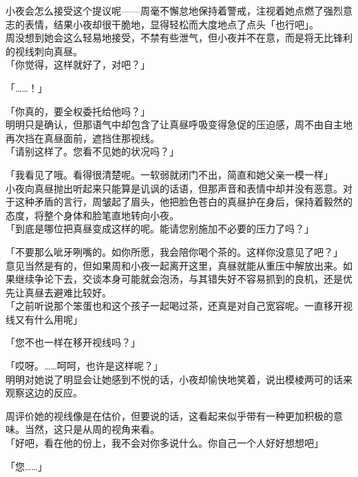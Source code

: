 小夜会怎么接受这个提议呢——周毫不懈怠地保持着警戒，注视着她点燃了强烈意志的表情，结果小夜却很干脆地，显得轻松而大度地点了点头「也行吧」。\\

周没想到她会这么轻易地接受，不禁有些泄气，但小夜并不在意，而是将无比锋利的视线刺向真昼。\\

「你觉得，这样就好了，对吧？」

「……！」

「你真的，要全权委托给他吗？」\\

明明只是确认，但那语气中却包含了让真昼呼吸变得急促的压迫感，周不由自主地再次挡在真昼面前，遮挡住那视线。\\

「请别这样了。您看不见她的状况吗？」

「我看见了哦。看得很清楚呢。一软弱就闭门不出，简直和她父亲一模一样」\\

小夜向真昼抛出听起来只能算是讥讽的话语，但那声音和表情中却并没有恶意。对于这种矛盾的言行，周皱起了眉头，他把脸色苍白的真昼护在身后，保持着毅然的态度，将整个身体和脸笔直地转向小夜。\\

「到底是哪位把真昼变成这样的呢。能请您别施加不必要的压力了吗？」

「不要那么呲牙咧嘴的。如你所愿，我会陪你喝个茶的。这样你没意见了吧？」\\

意见当然是有的，但如果周和小夜一起离开这里，真昼就能从重压中解放出来。如果继续争论下去，交谈本身可能就会泡汤，与其错失好不容易抓到的良机，还是优先让真昼去避难比较好。\\

「之前听说那个笨蛋也和这个孩子一起喝过茶，还真是对自己宽容呢。一直移开视线又有什么用呢」

「您不也一样在移开视线吗？」

「哎呀。……呵呵，也许是这样呢？」\\

明明对她说了明显会让她感到不悦的话，小夜却愉快地笑着，说出模棱两可的话来观察这边的反应。

周评价她的视线像是在估价，但要说的话，这看起来似乎带有一种更加积极的意味。当然，这只是从周的视角来看。\\

「好吧，看在他的份上，我不会对你多说什么。你自己一个人好好想想吧」

「您……」\\


